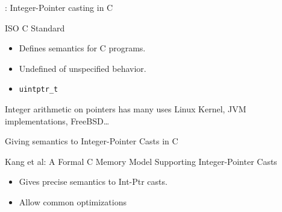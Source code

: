\begin{frame}[fragile]{\secname : Integer-Pointer casting in C}

  \begin{minipage}{0.48\textwidth}
    
  \end{minipage}
  \begin{minipage}{0.48\textwidth}
  \begin{alertblock}{ISO C Standard}
    \begin{itemize}
    \item Defines semantics for C programs.
    \item Undefined of unspecified behavior.
    \item \texttt{uintptr\_t}
    \end{itemize}
  \end{alertblock}
  \end{minipage}
  \vfill
  \begin{exampleblock}{Integer arithmetic on pointers has many uses}
    Linux Kernel, JVM implementations, FreeBSD\dots
  \end{exampleblock}
  
\end{frame}

\begin{frame}{Giving semantics to Integer-Pointer Casts in C}

  \begin{block}{Kang et al: A Formal C Memory Model Supporting Integer-Pointer Casts}
    \begin{itemize}
    \item Gives precise semantics to Int-Ptr casts.
    \item Allow common optimizations
    \end{itemize}
  \end{block}

\end{frame}


